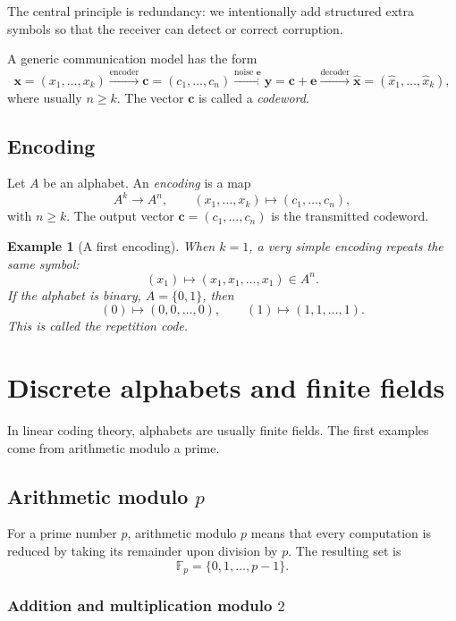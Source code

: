 \documentclass[11pt]{article}
\newtheorem{example}[definition]{Example}
\newcommand{\F}{\mathbb{F}}
\newcommand{\vect}[1]{\bm{#1}}
\begin{document}
\begin{keyidea}
The central principle is redundancy: we intentionally add structured extra symbols so that the receiver can detect or correct corruption.
\end{keyidea}

A generic communication model has the form
\[
\vect{x}=(x_1,\dots,x_k)
\xrightarrow{\text{encoder}}
\vect{c}=(c_1,\dots,c_n)
\xrightarrow{\text{noise }\vect e}
\vect{y}=\vect{c}+\vect{e}
\xrightarrow{\text{decoder}}
\hat{\vect{x}}=(\hat x_1,\dots,\hat x_k),
\]
where usually \(n\ge k\). The vector \(\vect{c}\) is called a \emph{codeword}.

\subsection{Encoding}

Let \(A\) be an alphabet. An \emph{encoding} is a map
\[
A^k \longrightarrow A^n,
\qquad
(x_1,\dots,x_k)\longmapsto (c_1,\dots,c_n),
\]
with \(n\ge k\). The output vector \(\vect c=(c_1,\dots,c_n)\) is the transmitted codeword.

\begin{example}[A first encoding]
When \(k=1\), a very simple encoding repeats the same symbol:
\[
(x_1)\longmapsto (x_1,x_1,\dots,x_1)\in A^n.
\]
If the alphabet is binary, \(A=\{0,1\}\), then
\[
(0)\mapsto (0,0,\dots,0),
\qquad
(1)\mapsto (1,1,\dots,1).
\]
This is called the \emph{repetition code}.
\end{example}

\section{Discrete alphabets and finite fields}

In linear coding theory, alphabets are usually finite fields. The first examples come from arithmetic modulo a prime.

\subsection{Arithmetic modulo \texorpdfstring{$p$}{p}}

For a prime number \(p\), arithmetic modulo \(p\) means that every computation is reduced by taking its remainder upon division by \(p\). The resulting set is
\[
\F_p=\{0,1,\dots,p-1\}.
\]

\subsubsection*{Addition and multiplication modulo \texorpdfstring{$2$}{2}}
\end{document}
